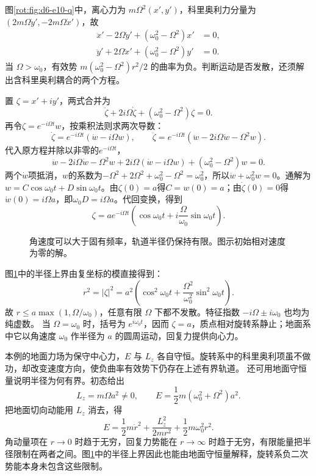 \begin{solution}
图\ref{rot:fig:d6-e10-q}中，离心力为 $m\Omega^2(x',y')$，科里奥利力分量为 $(2m\Omega\dot y',-2m\Omega\dot x')$，故
\[
\begin{aligned}
\ddot x'-2\Omega\dot y'+(\omega_0^2-\Omega^2)x'&=0,\\
\ddot y'+2\Omega\dot x'+(\omega_0^2-\Omega^2)y'&=0.
\end{aligned}
\]
当 $\Omega>\omega_0$，有效势 $m(\omega_0^2-\Omega^2)r^2/2$ 的曲率为负。判断运动是否发散，还须解出含科里奥利耦合的两个方程。

置 $\zeta=x'+iy'$，两式合并为
\[
\ddot\zeta+2i\Omega\dot\zeta+(\omega_0^2-\Omega^2)\zeta=0.
\]
再令$\zeta=e^{-i\Omega t}w$，按乘积法则求两次导数：
\[
\dot\zeta=e^{-i\Omega t}(\dot w-i\Omega w),\qquad
\ddot\zeta=e^{-i\Omega t}(\ddot w-2i\Omega\dot w-\Omega^2w).
\]
代入原方程并除以非零的$e^{-i\Omega t}$，
\[
\ddot w-2i\Omega\dot w-\Omega^2w
+2i\Omega(\dot w-i\Omega w)
+(\omega_0^2-\Omega^2)w=0.
\]
两个$\dot w$项抵消，$w$的系数为$-\Omega^2+2\Omega^2+\omega_0^2-\Omega^2=\omega_0^2$，所以$\ddot w+\omega_0^2w=0$。通解为$w=C\cos\omega_0t+D\sin\omega_0t$。由$\zeta(0)=a$得$C=w(0)=a$；由$\dot\zeta(0)=0$得$\dot w(0)=i\Omega a$，即$\omega_0D=i\Omega a$。代回变换，得到
\[
\boxed{\zeta=a e^{-i\Omega t}
\left(\cos\omega_0t+i\frac\Omega{\omega_0}\sin\omega_0t\right).}
\]
\begin{figure}[H]\centering
{}
\caption{角速度可以大于固有频率，轨道半径仍保持有限。图示初始相对速度为零的解。}\label{rot:fig:d6-e10-s}
\end{figure}
图\ref{rot:fig:d6-e10-s}中的半径上界由复坐标的模直接得到：
\[
r^2=|\zeta|^2=a^2\left(\cos^2\omega_0t
+\frac{\Omega^2}{\omega_0^2}\sin^2\omega_0t\right).
\]
故 $r\le a\max(1,\Omega/\omega_0)$，任意有限 $\Omega$ 下都不发散。特征指数 $-i\Omega\pm i\omega_0$ 也均为纯虚数。
当 $\Omega=\omega_0$ 时，括号为 $e^{i\omega_0t}$，因而 $\zeta=a$，质点相对旋转系静止；地面系中它以角速度 $\omega_0$ 作半径为 $a$ 的圆周运动，回复力提供向心力。

本例的地面力场为保守中心力，$E$ 与 $L_z$ 各自守恒。旋转系中的科里奥利项虽不做功，却改变速度方向，使负曲率有效势下仍存在上述有界轨道。
还可用地面守恒量说明半径为何有界。初态给出
\[
L_z=m\Omega a^2\ne0,\qquad E=\frac12m(\omega_0^2+\Omega^2)a^2.
\]
把地面切向动能用 $L_z$ 消去，得
\[
E=\frac12m\dot r^2+\frac{L_z^2}{2mr^2}+\frac12m\omega_0^2r^2.
\]
角动量项在 $r\to0$ 时趋于无穷，回复力势能在 $r\to\infty$ 时趋于无穷，有限能量把半径限制在两者之间。图\ref{rot:fig:d6-e10-s}中的半径上界因此也能由地面守恒量解释，旋转系负二次势能本身未包含这些限制。
\end{solution}



